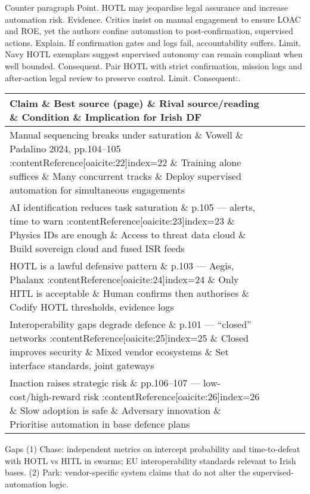 Counter paragraph
Point. HOTL may jeopardise legal assurance and increase automation risk.
Evidence. Critics insist on manual engagement to ensure LOAC and ROE, yet the authors confine automation to post-confirmation, supervised actions. {\small }
Explain. If confirmation gates and logs fail, accountability suffers.
Limit. Navy HOTL exemplars suggest supervised autonomy can remain compliant when well bounded. {\small }
Consequent. Pair HOTL with strict confirmation, mission logs and after-action legal review to preserve control. Limit. Consequent:.


\begin{tabular}{p{3.2cm}p{4.2cm}p{3.6cm}p{3.2cm}p{4.2cm}}
	\textbf{Claim} \& \textbf{Best source (page)} \& \textbf{Rival source/reading} \& \textbf{Condition} \& \textbf{Implication for Irish DF}\\\hline
	Manual sequencing breaks under saturation \& Vowell \& Padalino 2024, pp.104–105 {\small :contentReference[oaicite:22]{index=22}} \& Training alone suffices \& Many concurrent tracks \& Deploy supervised automation for simultaneous engagements \\
	AI identification reduces task saturation \& p.105 — alerts, time to warn {\small :contentReference[oaicite:23]{index=23}} \& Physics IDs are enough \& Access to threat data cloud \& Build sovereign cloud and fused ISR feeds \\
	HOTL is a lawful defensive pattern \& p.103 — Aegis, Phalanx {\small :contentReference[oaicite:24]{index=24}} \& Only HITL is acceptable \& Human confirms then authorises \& Codify HOTL thresholds, evidence logs \\
	Interoperability gaps degrade defence \& p.101 — “closed” networks {\small :contentReference[oaicite:25]{index=25}} \& Closed improves security \& Mixed vendor ecosystems \& Set interface standards, joint gateways \\
	Inaction raises strategic risk \& pp.106–107 — low-cost/high-reward risk {\small :contentReference[oaicite:26]{index=26}} \& Slow adoption is safe \& Adversary innovation \& Prioritise automation in base defence plans \\\hline
\end{tabular}

Gaps
(1) Chase: independent metrics on intercept probability and time-to-defeat with HOTL vs HITL in swarms; EU interoperability standards relevant to Irish bases.
(2) Park: vendor-specific system claims that do not alter the supervised-automation logic.

